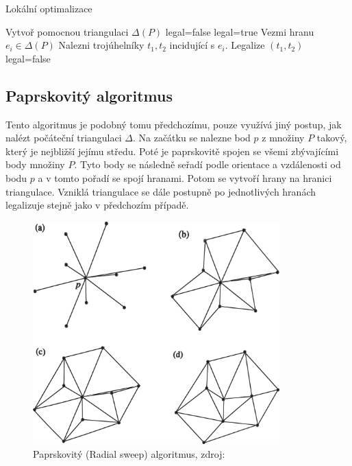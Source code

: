 \documentclass[12pt,a4paper]{article}
\begin{document}
\begin{algorithm}
\caption{Lokální optimalizace}
\begin{algorithmic}[1]
\State Vytvoř pomocnou triangulaci $\Delta(P)$
\State legal=false
	\State legal=true
		\State Vezmi hranu $e_i \in \Delta(P)$
		\State Nalezni trojúhelníky $t_1,t_2$ incidující s $e_i$.
			\State Legalize $(t_1,t_2)$
			\State legal=false
		\EndIf
	\EndFor
\EndWhile	
\end{algorithmic}
\end{algorithm}

\newpage
\subsection{Paprskovitý algoritmus}

Tento algoritmus je podobný tomu předchozímu, pouze využívá jiný
postup, jak nalézt počáteční triangulaci $\Delta$. Na začátku se
nalezne bod $p$ z množiny $P$ takový, který je nejbližší jejímu
středu. Poté je paprskovitě spojen se všemi zbývajícími body množiny
$P$. Tyto body se následně seřadí podle orientace a vzdálenosti od
bodu $p$ a v tomto pořadí se spojí hranami. Potom se vytvoří hrany na
hranici triangulace. Vzniklá triangulace se dále postupně po
jednotlivých hranách legalizuje stejně jako v předchozím případě.

\begin{figure}[h!]
\centering
\includegraphics[width=0.85\textwidth]{img/rsweep.png}
\caption{Paprskovitý (Radial sweep) algoritmus, zdroj: \cite{triangulation}}
\label{fig:rsweep}
\end{figure}
\end{document}
